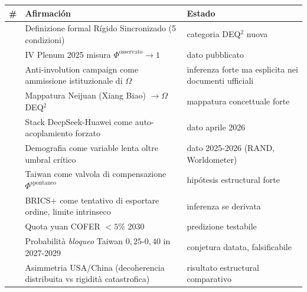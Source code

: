 {\def\LTcaptype{none} %
{\small\begin{longtable}[]{@{}
  >{\raggedright\arraybackslash}p{}
  >{\raggedright\arraybackslash}p{}
  >{\raggedright\arraybackslash}p{}@{}}
\toprule\noalign{}
\begin{minipage}[b]{\linewidth}\raggedright
\#
\end{minipage} & \begin{minipage}[b]{\linewidth}\raggedright
Afirmación
\end{minipage} & \begin{minipage}[b]{\linewidth}\raggedright
Estado
\end{minipage} \\
\midrule\noalign{}
\endhead
\bottomrule\noalign{}
\endlastfoot
1 & Definizione formal Rígido Sincronizado (5 condizioni) & \Hypoth{}
categoria DEQ$^2$ nuova \\
2 & IV Plenum 2025 misura \(\Phi^{\text{osservato}} \to 1\) & \Proved{}
dato pubblicato \\
3 & Anti-involution campaign come ammissione istituzionale di \(\Omega\)
& \Hypoth{} inferenza forte ma esplicita nei documenti ufficiali \\
4 & Mappatura Neijuan (Xiang Biao) \(\to \Omega\) DEQ$^2$ & \Hypoth{}
mappatura concettuale forte \\
5 & Stack DeepSeek-Huawei come auto-acoplamiento forzato & \Proved{}
dato aprile 2026 \\
6 & Demografia come variable lenta oltre umbral crítico & \Proved{}
dato 2025-2026 (RAND, Worldometer) \\
7 & Taiwan come valvola di compensazione \(\Phi^{\text{spontaneo}}\) &
\Conj{} hipótesis estructural forte \\
8 & BRICS+ come tentativo di esportare ordine, limite intrinseco &
\Hypoth{} inferenza se derivata \\
9 & Quota yuan COFER \(< 5\%\) 2030 & \Conj{} predizione testabile \\
10 & Probabilità \emph{bloqueo} Taiwan \(0{,}25\)-\(0{,}40\) in
2027-2029 & \Conj{} conjetura datata, falsificabile \\
11 & Asimmetria USA/China (decoherencia distribuita vs rigidità
catastrofica) & \Hypoth{} risultato estructural comparativo \\
\end{longtable}}
}



